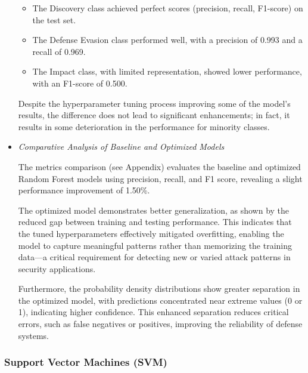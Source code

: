 \begin{itemize}
                    \begin{itemize}
                        \item The Discovery class achieved perfect scores (precision, recall, F1-score) on the test set.
                        \item The Defense Evasion class performed well, with a precision of 0.993 and a recall of 0.969.
                        \item The Impact class, with limited representation, showed lower performance, with an F1-score of 0.500.
                    \end{itemize}

                    Despite the hyperparameter tuning process improving some of the model's results, the difference does not lead to significant enhancements; in fact, it results in some deterioration in the performance for minority classes.

                \vspace{0.5em}

                \item \textit{Comparative Analysis of Baseline and Optimized Models}
                
                    \vspace{0.3em}

                        The metrics comparison (see Appendix) evaluates the baseline and optimized Random Forest models using precision, recall, and F1 score, revealing a slight performance improvement of 1.50\%.

                        The optimized model demonstrates better generalization, as shown by the reduced gap between training and testing performance. This indicates that the tuned hyperparameters effectively mitigated overfitting, enabling the model to capture meaningful patterns rather than memorizing the training data—a critical requirement for detecting new or varied attack patterns in security applications.

                        Furthermore, the probability density distributions show greater separation in the optimized model, with predictions concentrated near extreme values (0 or 1), indicating higher confidence. This enhanced separation reduces critical errors, such as false negatives or positives, improving the reliability of defense systems.

            \end{itemize}

        \subsubsection{Support Vector Machines (SVM)}
        
